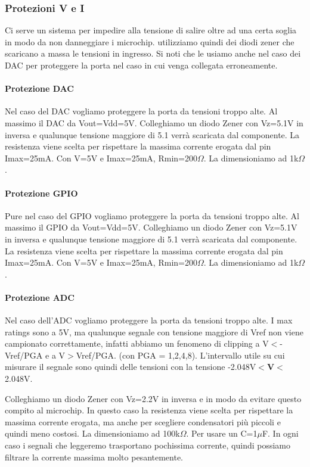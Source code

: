 \documentclass[10pt]{article}
\begin{document}
		\subsubsection{Protezioni V e I}
		Ci serve un sistema per impedire alla tensione di salire oltre ad una certa soglia in modo da non danneggiare i microchip. utilizziamo quindi dei diodi zener che scaricano a massa le tensioni in ingresso.
		Si noti che le usiamo anche nel caso dei DAC per proteggere la porta nel caso in cui venga collegata erroneamente.
			\paragraph{Protezione DAC}
				Nel caso del DAC vogliamo proteggere la porta da tensioni troppo alte. Al massimo il DAC da Vout=Vdd=5V. Colleghiamo un diodo Zener con Vz=5.1V in inversa e qualunque tensione maggiore di 5.1 verrà scaricata dal componente.
				La resistenza viene scelta per rispettare la massima corrente erogata dal pin Imax=25mA. Con V=5V e Imax=25mA, Rmin=200\(\Omega\). La dimensioniamo ad 1k\(\Omega\).
			\paragraph{Protezione GPIO}
				Pure nel caso del GPIO vogliamo proteggere la porta da tensioni troppo alte. Al massimo il GPIO da Vout=Vdd=5V. Colleghiamo un diodo Zener con Vz=5.1V in inversa e qualunque tensione maggiore di 5.1 verrà scaricata dal componente.
				La resistenza viene scelta per rispettare la massima corrente erogata dal pin Imax=25mA. Con V=5V e Imax=25mA, Rmin=200\(\Omega\). La dimensioniamo ad 1k\(\Omega\).
			\paragraph{Protezione ADC}
				Nel caso dell'ADC vogliamo proteggere la porta da tensioni troppo alte. I max ratings sono a 5V, ma qualunque segnale con tensione maggiore di Vref non viene campionato correttamente,
				infatti abbiamo un fenomeno di clipping a V\(<\)-Vref/PGA e a V\(>\)Vref/PGA. (con PGA = 1,2,4,8).
				L'intervallo utile su cui misurare il segnale sono quindi delle tensioni con la tensione -2.048V\(<\)\textbf{V}\(<\)2.048V.
				
				Colleghiamo un diodo Zener con Vz=2.2V in inversa e in modo da evitare questo compito al microchip.
				In questo caso la resistenza viene scelta per rispettare la massima corrente erogata, ma anche per scegliere condensatori più piccoli e quindi meno costosi.
				La dimensioniamo ad 100k\(\Omega\). Per usare un C=1\(\mu\)F. In ogni caso i segnali che leggeremo trasportano pochissima corrente, quindi possiamo filtrare la corrente massima molto pesantemente.
\end{document}
